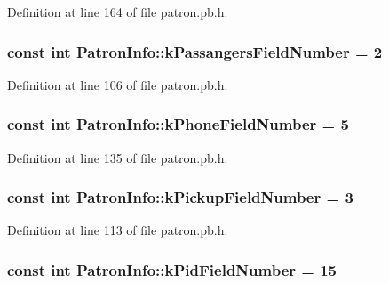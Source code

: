 Definition at line 164 of file patron.\-pb.\-h.

\hypertarget{classPatronInfo_a9293f9c368f4a26dae441b8be1bc0a48}{
\subsubsection[{k\-Passangers\-Field\-Number}]{\setlength{\rightskip}{0pt plus 5cm}const int Patron\-Info\-::k\-Passangers\-Field\-Number = 2\hspace{0.3cm}{\ttfamily [static]}}}\label{classPatronInfo_a9293f9c368f4a26dae441b8be1bc0a48}


Definition at line 106 of file patron.\-pb.\-h.

\hypertarget{classPatronInfo_a3b10e13c85c247bbfeb1633349e44510}{
\subsubsection[{k\-Phone\-Field\-Number}]{\setlength{\rightskip}{0pt plus 5cm}const int Patron\-Info\-::k\-Phone\-Field\-Number = 5\hspace{0.3cm}{\ttfamily [static]}}}\label{classPatronInfo_a3b10e13c85c247bbfeb1633349e44510}


Definition at line 135 of file patron.\-pb.\-h.

\hypertarget{classPatronInfo_a62a97ad57161f8a87c7a80f0c4a13be8}{
\subsubsection[{k\-Pickup\-Field\-Number}]{\setlength{\rightskip}{0pt plus 5cm}const int Patron\-Info\-::k\-Pickup\-Field\-Number = 3\hspace{0.3cm}{\ttfamily [static]}}}\label{classPatronInfo_a62a97ad57161f8a87c7a80f0c4a13be8}


Definition at line 113 of file patron.\-pb.\-h.

\hypertarget{classPatronInfo_a6e42e11ca2aec51757ccde9474792b10}{
\subsubsection[{k\-Pid\-Field\-Number}]{\setlength{\rightskip}{0pt plus 5cm}const int Patron\-Info\-::k\-Pid\-Field\-Number = 15\hspace{0.3cm}{\ttfamily [static]}}}\label{classPatronInfo_a6e42e11ca2aec51757ccde9474792b10}


